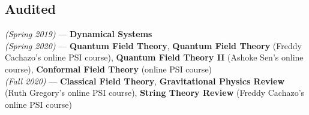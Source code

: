 \documentclass[11pt, a4paper]{article}
\begin{document}
\subsection{\large Audited}
\hspace{0.01\linewidth}
\parbox{0.88\linewidth}{
    {\textit{(Spring 2019)} --- \small \textbf{Dynamical Systems}} \\
    {\textit{(Spring 2020)} --- \small \textbf{Quantum Field Theory}, \textbf{Quantum Field Theory} (Freddy Cachazo's online PSI course), \textbf{Quantum Field Theory II} (Ashoke Sen's online course), \textbf{Conformal Field Theory} (online PSI course)} \\
    {\textit{(Fall 2020)} --- \small \textbf{Classical Field Theory}, \textbf{Gravitational Physics Review} (Ruth Gregory's online PSI course), \textbf{String Theory Review} (Freddy Cachazo's online PSI course)}
}
\end{document}
